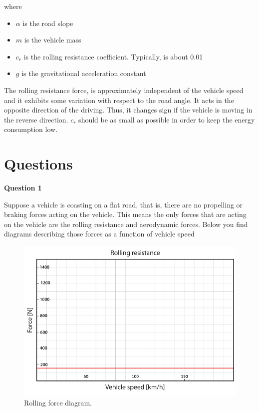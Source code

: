 where 

\begin{itemize}
\item $\alpha$ is the road slope
\item $m$ is the vehicle mass
\item $c_r$ is the rolling resistance coefficient. Typically, is about 0.01 
\item $g$ is the gravitational acceleration constant
\end{itemize}

The rolling resistance force, is approximately independent of the vehicle speed and it exhibits some variation with respect to the road angle. It acts in the opposite direction of the
driving. Thus, it changes sign if the vehicle is moving in the reverse direction. $c_r$ should be as small as possible in order to keep the energy consumption low. 


\section{Questions}


\textbf{Question 1}

Suppose a vehicle is coasting on a flat road, that is, there are no propelling or braking forces acting on the vehicle. This means the only forces that are acting on the vehicle are the rolling resistance and aerodynamic forces. Below you find diagrams describing those forces as a function of vehicle speed

\begin{figure}[!htb]
\begin{center}
\includegraphics[scale=0.280]{img/physics/Diagram_RollingResistance_01.png}
\end{center}
\caption{Rolling force diagram.}
\label{Diagram_RollingResistance_01}
\end{figure}

